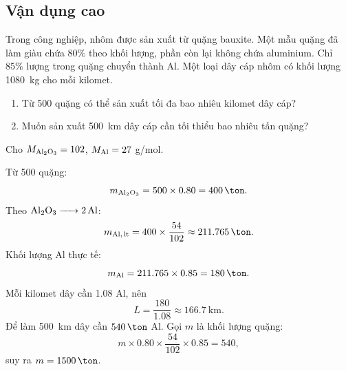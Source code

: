 \subsection{Vận dụng cao}

\begin{tuluyen}
Trong công nghiệp, nhôm được sản xuất từ quặng bauxite. Một mẫu quặng đã làm giàu chứa \(80\%\)  theo khối lượng, phần còn lại không chứa aluminium. Chỉ \(85\%\) lượng  trong quặng chuyển thành Al. Một loại dây cáp nhôm có khối lượng \SI{1080}{\kilo\gram} cho mỗi kilomet.
\begin{enumerate}
\item Từ \SI{500}{\ton} quặng có thể sản xuất tối đa bao nhiêu kilomet dây cáp?
\item Muốn sản xuất \SI{500}{\kilo\metre} dây cáp cần tối thiểu bao nhiêu tấn quặng?
\end{enumerate}
Cho \(M_{\ce{Al2O3}}=102\), \(M_{\ce{Al}}=27\) g/mol.
\begin{loigiaiBT}
Từ \SI{500}{\ton} quặng:
\[
m_{\ce{Al2O3}}=500\times0.80=\SI{400}{\ton}.
\]
Theo \(\ce{Al2O3 -> 2Al}\):
\[
m_{\ce{Al,lt}}=400\times\frac{54}{102}\approx\SI{211.765}{\ton}.
\]
Khối lượng Al thực tế:
\[
m_{\ce{Al}}=211.765\times0.85=\SI{180}{\ton}.
\]
Mỗi kilomet dây cần \SI{1.08}{\ton} Al, nên
\[
L=\frac{180}{1.08}\approx\SI{166.7}{\kilo\metre}.
\]
Để làm \SI{500}{\kilo\metre} dây cần \(\SI{540}{\ton}\) Al. Gọi \(m\) là khối lượng quặng:
\[
m\times0.80\times\frac{54}{102}\times0.85=540,
\]
suy ra \(m=\SI{1500}{\ton}\).
\end{loigiaiBT}
\end{tuluyen}

